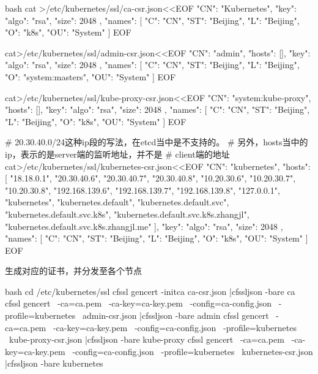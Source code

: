 \begin{outline}[enumerate]
\begin{code-in-enumerate}{bash}
cat >/etc/kubernetes/ssl/ca-csr.json<<EOF
{
    "CN": "Kubernetes",
    "key": {
        "algo": "rsa",
        "size": 2048
    },
    "names": [
        {
            "C": "CN",
            "ST": "Beijing",
            "L": "Beijing",
            "O": "k8s",
            "OU": "System"
        }
    ]
}
EOF

cat>/etc/kubernetes/ssl/admin-csr.json<<EOF
{
    "CN": "admin",
    "hosts": [],
    "key": {
        "algo": "rsa",
        "size": 2048
    },
    "names": [
        {
            "C": "CN",
            "ST": "Beijing",
            "L": "Beijing",
            "O": "system:masters",
            "OU": "System"
        }
    ]
}
EOF

cat>/etc/kubernetes/ssl/kube-proxy-csr.json<<EOF
{
    "CN": "system:kube-proxy",
    "hosts": [],
    "key": {
        "algo": "rsa",
        "size": 2048
    },
    "names": [
        {
            "C": "CN",
            "ST": "Beijing",
            "L": "Beijing",
            "O": "k8s",
            "OU": "System"
        }
    ]
}
EOF

# 20.30.40.0/24这种ip段的写法，在etcd当中是不支持的。
# 另外，hosts当中的ip，表示的是server端的监听地址，并不是
# client端的地址
cat>/etc/kubernetes/ssl/kubernetes-csr.json<<EOF
{
    "CN": "kubernetes",
    "hosts": [
        "18.18.0.1",
        "20.30.40.6",
        "20.30.40.7",
        "20.30.40.8",
        "10.20.30.6",
        "10.20.30.7",
        "10.20.30.8",
        "192.168.139.6",
        "192.168.139.7",
        "192.168.139.8",
        "127.0.0.1",
        "kubernetes",
        "kubernetes.default",
        "kubernetes.default.svc",
        "kubernetes.default.svc.k8s",
        "kubernetes.default.svc.k8s.zhangjl",
        "kubernetes.default.svc.k8s.zhangjl.me"
    ],
    "key": {
        "algo": "rsa",
        "size": 2048
    },
    "names": [
        {
            "C": "CN",
            "ST": "Beijing",
            "L": "Beijing",
            "O": "k8s",
            "OU": "System"
        }
    ]
}
EOF

\end{code-in-enumerate}
生成对应的证书，并分发至各个节点
\begin{code-in-enumerate}{bash}
cd /etc/kubernetes/ssl
cfssl gencert -initca ca-csr.json |cfssljson -bare ca
cfssl gencert \
      -ca=ca.pem \
      -ca-key=ca-key.pem \
      -config=ca-config.json \
      -profile=kubernetes \
      admin-csr.json |cfssljson -bare admin
cfssl gencert \
      -ca=ca.pem \
      -ca-key=ca-key.pem \
      -config=ca-config.json \
      -profile=kubernetes \
      kube-proxy-csr.json |cfssljson -bare kube-proxy
cfssl gencert \
      -ca=ca.pem \
      -ca-key=ca-key.pem \
      -config=ca-config.json \
      -profile=kubernetes \
      kubernetes-csr.json |cfssljson -bare kubernetes


\end{code-in-enumerate}
\end{outline}
